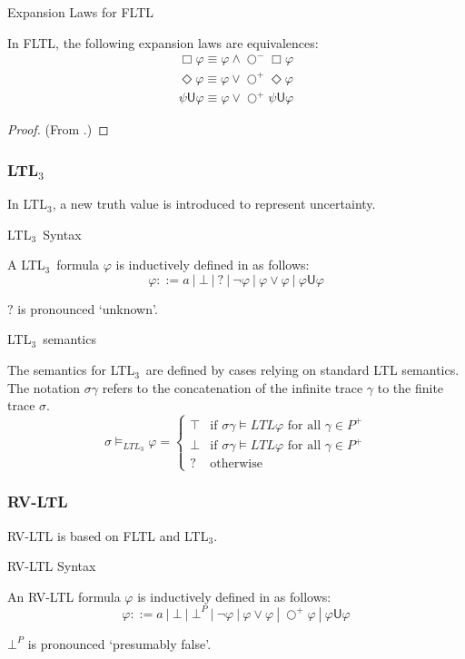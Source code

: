 \documentclass[a4paper]{article}
\newcommand{\U}{\mathsf{U}}
\newcommand{\fall}{\text{ for all }}
\newcommand{\sn}{\bigcirc^+}
\newcommand{\wn}{\bigcirc^-}
\newcommand{\ltlt}{LTL$_3$}
\begin{document}
\begin{lem}{Expansion Laws for FLTL}\label{fltlexp}

  In FLTL, the following expansion laws are equivalences:
  \begin{align}
    \Box \varphi \equiv \varphi \land \wn \Box \varphi \label{felBox}\\
    \Diamond \varphi \equiv \varphi \lor \sn \Diamond \varphi\label{felDiamond}\\
    \psi \U \varphi \equiv \varphi \lor \sn \psi \U \varphi\label{felU}
  \end{align}

\end{lem}

\begin{proof}
  (From \autocite{bauer2010comparing}.)
\end{proof}

\subsubsection{\ltlt} In \ltlt, a new truth value is introduced to represent uncertainty.

\begin{defn}{\ltlt\ Syntax}

  A \ltlt\ formula $\varphi$ is inductively defined in as follows:
  \[\varphi ::= a ~|~ \bot ~|~ ? ~|~ \neg \varphi ~|~\varphi \lor \varphi ~|~ \varphi \U\varphi\]

  $?$ is pronounced `unknown'.
\end{defn}
\begin{defn}{\ltlt\ semantics}

  The semantics for \ltlt\ are defined by cases relying on standard LTL semantics. The notation $\sigma\gamma$ refers to the concatenation of the infinite trace $\gamma$ to the finite trace $\sigma$.
  \[\sigma\vDash_{LTL_3}\varphi =
    \begin{cases}
      \top & \text{if } \sigma\gamma \vDash{LTL} \varphi \fall \gamma \in P^+\\
      \bot & \text{if } \sigma\gamma \vDash{LTL} \varphi \fall \gamma \in P^+\\
      ? & \text{otherwise}
    \end{cases}
    \]
\end{defn}

\subsubsection{RV-LTL} RV-LTL is based on FLTL and \ltlt.
\begin{defn}{RV-LTL Syntax}

  An RV-LTL formula $\varphi$ is inductively defined in as follows:
  \[\varphi ::= a ~|~ \bot ~|~ \bot^P ~|~ \neg \varphi ~|~\varphi \lor \varphi ~|~ \sn \varphi ~|~ \varphi \U\varphi\]

  $\bot^P$ is pronounced `presumably false'.
\end{defn}
\end{document}
